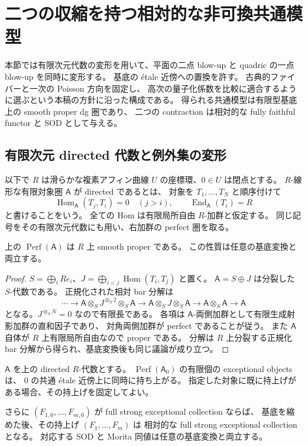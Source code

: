 \section{二つの収縮を持つ相対的な非可換共通模型}
\label{sec:relative-common-blowup}

本節では有限次元代数の変形を用いて、平面の二点 blow-up と
quadric の一点 blow-up を同時に変形する。
基底の \'etale 近傍への置換を許す。
古典的ファイバーと一次の Poisson 方向を固定し、
高次の量子化係数を比較に適合するように選ぶという本稿の方針に沿った構成である。
得られる共通模型は有限型基底上の smooth proper dg 圏であり、
二つの contraction は相対的な fully faithful functor と SOD として与える。

\subsection{有限次元 directed 代数と例外集の変形}

以下で $R$ は滑らかな複素アフィン曲線 $U$ の座標環、$0\in U$ は閉点とする。
$R$-線形な有限対象圏 $\mathsf A$ が directed であるとは、
対象を $T_1,\ldots,T_N$ と順序付けて
\[
 \operatorname{Hom}_{\mathsf A}(T_j,T_i)=0\quad(j>i),\qquad
 \operatorname{End}_{\mathsf A}(T_i)=R
\]
と書けることをいう。
全ての Hom は有限局所自由 $R$-加群と仮定する。
同じ記号をその有限次元代数にも用い、右加群の perfect 圏を取る。

\begin{lemma}\label{lem:directed-relative-smooth}
上の $\operatorname{Perf}(\mathsf A)$ は $R$ 上 smooth proper である。
この性質は任意の基底変換と両立する。
\end{lemma}

\begin{proof}
$S=\bigoplus_iRe_i$、$J=\bigoplus_{i<j}\operatorname{Hom}(T_i,T_j)$ と置く。
$\mathsf A=S\oplus J$ は分裂した $S$-代数である。
正規化された相対 bar 分解は
\[
 \cdots\longrightarrow
 \mathsf A\otimes_SJ^{\otimes_S2}\otimes_S\mathsf A
 \longrightarrow\mathsf A\otimes_SJ\otimes_S\mathsf A
 \longrightarrow\mathsf A\otimes_S\mathsf A
 \longrightarrow\mathsf A
\]
となる。$J^{\otimes_SN}=0$ なので有限長である。
各項は $\mathsf A$-両側加群として有限生成射影加群の直和因子であり、
対角両側加群が perfect であることが従う。
また $\mathsf A$ 自体が $R$ 上有限局所自由なので proper である。
分解は $R$ 上分裂する正規化 bar 分解から得られ、基底変換後も同じ議論が成り立つ。
\end{proof}

\begin{lemma}\label{lem:exceptional-etale-lift}
$\mathsf A$ を上の directed $R$-代数とする。
$\operatorname{Perf}(\mathsf A_0)$ の有限個の exceptional objects は、
$0$ の共通 \'etale 近傍上に同時に持ち上がる。
指定した対象に既に持上げがある場合、その持上げを固定してよい。

さらに $(F_{1,0},\ldots,F_{m,0})$ が full strong exceptional collection ならば、
基底を縮めた後、その持上げ $(F_1,\ldots,F_m)$ は
相対的な full strong exceptional collection となる。
対応する SOD と Morita 同値は任意の基底変換と両立する。
\end{lemma}

